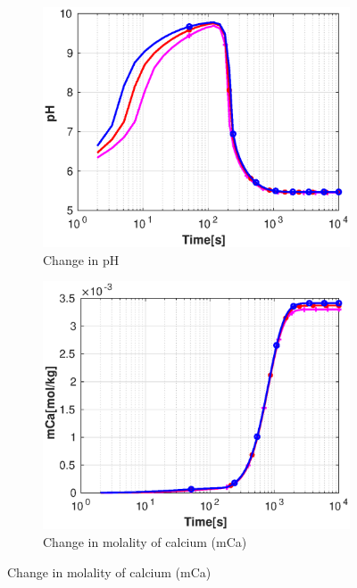 \begin{figure}[!h]
        \centering
    \begin{subfigure}{.5\linewidth}
            \centering
        \includegraphics[width=\textwidth]{PICTURES/with_grid_pH.eps}
        \caption{Change in pH}
        \label{fig:gridpH}
    \end{subfigure}%
        \hfill
    \begin{subfigure}{.5\linewidth}
            \centering
        \includegraphics[width=\textwidth]{PICTURES/with_grid_mCa.eps}
        \caption{Change in molality of calcium (mCa)}
        \label{fig:gridmCa}
    \end{subfigure}%

\end{figure}

